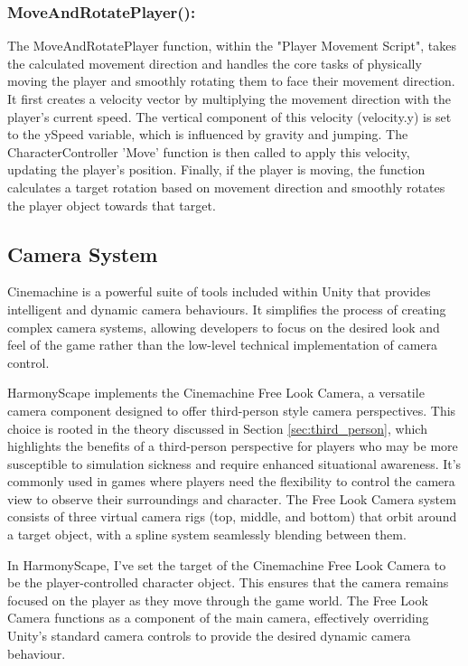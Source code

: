 \documentclass{l4proj}
\begin{document}
\subsubsection{MoveAndRotatePlayer():}
The MoveAndRotatePlayer function, within the "Player Movement Script", takes the calculated movement direction and handles the core tasks of physically moving the player and smoothly rotating them to face their movement direction. It first creates a velocity vector by multiplying the movement direction with the player's current speed. The vertical component of this velocity (velocity.y) is set to the ySpeed variable, which is influenced by gravity and jumping. The  CharacterController 'Move' function is then called to apply this velocity, updating the player's position. Finally, if the player is moving, the function calculates a target rotation based on movement direction and smoothly rotates the player object towards that target.

\subsection{Camera System}
Cinemachine is a powerful suite of tools included within Unity that provides intelligent and dynamic camera behaviours. It simplifies the process of creating complex camera systems, allowing developers to focus on the desired look and feel of the game rather than the low-level technical implementation of camera control.

HarmonyScape implements the Cinemachine Free Look Camera, a versatile camera component designed to offer third-person style camera perspectives. This choice is rooted in the theory discussed in Section \ref{sec:third_person}, which highlights the benefits of a third-person perspective for players who may be more susceptible to simulation sickness and require enhanced situational awareness. It's commonly used in games where players need the flexibility to control the camera view to observe their surroundings and character. The Free Look Camera system consists of three virtual camera rigs (top, middle, and bottom) that orbit around a target object, with a spline system seamlessly blending between them.

In HarmonyScape, I've set the target of the Cinemachine Free Look Camera to be the player-controlled character object. This ensures that the camera remains focused on the player as they move through the game world. The Free Look Camera functions as a component of the main camera, effectively overriding Unity's standard camera controls to provide the desired dynamic camera behaviour.
\end{document}
